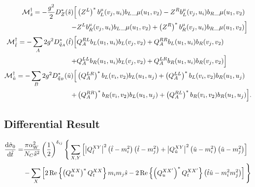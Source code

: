 \documentclass[../main.tex]{subfiles}
\begin{document}
\begin{temporary}

  \begin{subequations}
    \begin{align}
      \nonumber
      \M^\dagger_{\hat{s}} = -\frac{g^2}{2} D_Z^\ast(\hat{s})
      \Big[                               &
        \pclosed{Z^L}^\ast b_L^\mu(v_j,
        u_i){b_L}\_{\mu}(u_1,
        v_2) -
        Z^R b_L^\mu(v_j, u_i){b_R}\_{\mu}(u_1, v_2)
      \\
        -
                                          & Z^L b_R^\mu(v_j,
        u_i){b_L}\_{\mu}(u_1, v_2) +
        \pclosed{Z^R}^\ast b_R^\mu(v_j,
        u_i){b_R}\_{\mu}(u_1,
        v_2) \Big]
      \\
      \nonumber
      \M^\dagger_{\hat{t}} = -\sum_A 2g^2
      D^\ast_{\tilde{q}_A}(\hat{t}) \Big[ & Q_A^{RL} b_L(u_1,
      u_i) b_L(v_j, v_2) +
      Q_A^{RR} b_L(u_1, u_i) b_R(v_j, v_2)
      \\
      +
                                          & Q_A^{LL} b_R(u_1,
      u_i) b_L(v_j, v_2) + Q_A^{LR} b_R(u_1, u_i)
      b_R(v_j, v_2) \Big]
      \\
      \nonumber
      \M^\dagger_{\hat{u}} = -\sum_B 2g^2
      D^\ast_{\tilde{q}_B}(\hat{u}) \Big[ &
      \pclosed{Q_A^{LR}}^\ast b_L(v_i, v_2)
      b_L(u_1, u_j) + \pclosed{Q_A^{LL}}^\ast b_L(v_i, v_2)
      b_R(u_1, u_j)
      \\
      +
                                          &
      \pclosed{Q_A^{RR}}^\ast b_R(v_i, v_2) b_L(u_1, u_j) +
      \pclosed{Q_A^{RL}}^\ast b_R(v_i, v_2) b_R(u_1, u_j)
      \Big].
    \end{align}
  \end{subequations}

\end{temporary}

\subsection{Differential Result}
\begin{align}
  \nonumber
  \d[\hat{t}]{\hat{\sigma}_0} = & \frac{\pi \alpha_W^2}{N_C \hat{s}^2}
  \pclosed{\frac{1}{2}}^{\delta_{ij}} \Bigg\{ \sum_{X,Y}
  \bclosed{\abs{Q^{XY}_{\hat{t}}}^2
    \pclosed{\hat{t}-m_i^2}\pclosed{\hat{t}-m_j^2} +
    \abs{Q^{XY}_{\hat{u}}}^2
  \pclosed{\hat{u}-m_i^2}\pclosed{\hat{u}-m_j^2}}                      \\
                                & - \sum_X
  \bclosed{2\Re{\pclosed{Q_{u}^{XX}}^\ast Q_{t}^{XX}} m_i m_j \hat{s} -
    2\Re{\pclosed{Q_{u}^{XX^\prime}}^\ast Q_{t}^{XX^\prime}}
    \pclosed{\hat{t}\hat{u} - m_i^2m_j^2}} \Bigg\}
\end{align}
\end{document}
